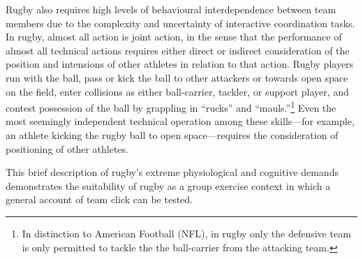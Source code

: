 \begin{CJK}{UTF8}{gbsn}
Rugby also requires high levels of behavioural interdependence between team members due to the complexity and uncertainty of interactive coordination tasks. In rugby, almost all action is joint action, in the sense that the performance of almost all technical actions requires either direct or indirect consideration of the position and intensions of other athletes in relation to that action.  Rugby players run with the ball, pass or kick the ball to other attackers or towards open space on the field, enter collisions as either ball-carrier, tackler, or support player, and contest possession of the ball by grappling in ``rucks'' and ``mauls.''\footnote{In distinction to American Football (NFL), in rugby only the defensive team is only permitted to tackle the the ball-carrier from the attacking team.}  Even the most seemingly independent technical operation among these skills---for example, an athlete kicking the rugby ball to open space---requires the consideration of positioning of other athletes.

This brief description of rugby's extreme physiological and cognitive demands demonstrates the suitability of rugby as a group exercise context in which a general account of team click can be tested.




\end{CJK}
